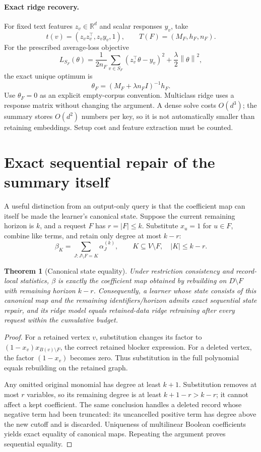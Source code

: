\documentclass[11pt,a4paper]{article}
\newtheorem{theorem}{Theorem}[section]
\theoremstyle{definition}\newtheorem{definition}[theorem]{Definition}
\newcommand{\R}{\mathbb R}\newcommand{\E}{\mathbb E}\newcommand{\1}{\mathbf 1}
\newcommand{\norm}[1]{\left\lVert #1\right\rVert}
\newcommand{\minus}{\setminus}
\begin{document}
\paragraph{Exact ridge recovery.} For fixed text features $z_v\in\R^d$ and scalar responses $y_v$, take
\[
 t(v)=(z_vz_v^\top,z_vy_v,1),\qquad T(F)=(M_F,h_F,n_F).
\]
For the prescribed average-loss objective
\[
 L_{S_F}(\theta)=\frac1{2n_F}\sum_{v\in S_F}(z_v^\top\theta-y_v)^2+
                 \frac\lambda2\norm{\theta}^2,
\]
the exact unique optimum is
\begin{equation}\label{eq:ridge}
 \theta_F=(M_F+\lambda n_F I)^{-1}h_F.
\end{equation}
Use $\theta_F=0$ as an explicit empty-corpus convention. Multiclass ridge uses a response matrix without changing the argument. A dense solve costs $O(d^3)$; the summary stores $O(d^2)$ numbers per key, so it is not automatically smaller than retaining embeddings. Setup cost and feature extraction must be counted.

\section{Exact sequential repair of the summary itself}\label{sec:canonical}
A useful distinction from an output-only query is that the coefficient map can itself be made the learner's canonical state. Suppose the current remaining horizon is $k$, and a request $F$ has $r=|F|\le k$. Substitute $x_u=1$ for $u\in F$, combine like terms, and retain only degree at most $k-r$:
\begin{equation}\label{eq:state}
 \beta_K=\sum_{J:J\minus F=K}\alpha_J^{(k)},
 \qquad K\subseteq V\minus F,\quad |K|\le k-r.
\end{equation}

\begin{theorem}[Canonical state equality]\label{thm:state}
Under restriction consistency and record-local statistics, $\beta$ is exactly the coefficient map obtained by rebuilding on $D\minus F$ with remaining horizon $k-r$. Consequently, a learner whose state consists of this canonical map and the remaining identifiers/horizon admits exact sequential state repair, and its ridge model equals retained-data ridge retraining after every request within the cumulative budget.
\end{theorem}
\begin{proof}
For a retained vertex $v$, substitution changes its factor to
$(1-x_v)x_{B(v)\minus F}$, the correct retained blocker expression. For a deleted vertex, the factor $(1-x_v)$ becomes zero. Thus substitution in the full polynomial equals rebuilding on the retained graph.

Any omitted original monomial has degree at least $k+1$. Substitution removes at most $r$ variables, so its remaining degree is at least $k+1-r>k-r$; it cannot affect a kept coefficient. The same conclusion handles a deleted record whose negative term had been truncated: its uncancelled positive term has degree above the new cutoff and is discarded. Uniqueness of multilinear Boolean coefficients yields exact equality of canonical maps. Repeating the argument proves sequential equality.
\end{proof}
\end{document}
